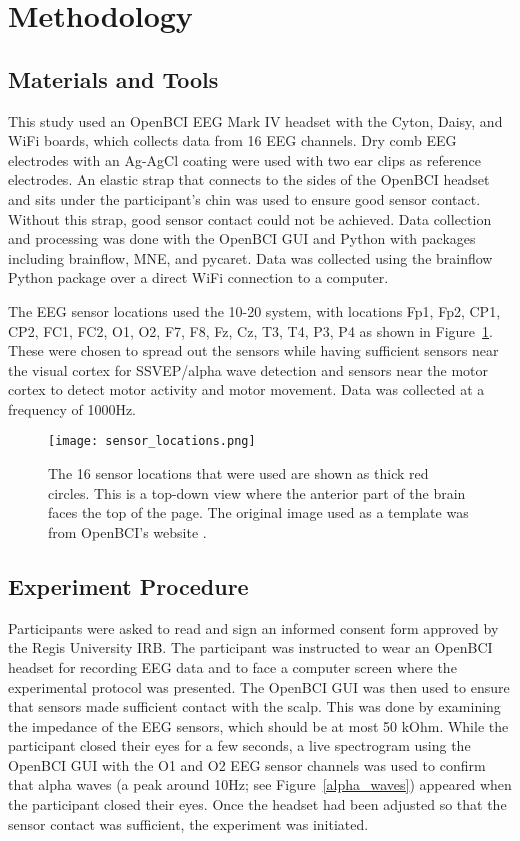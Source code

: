\documentclass{article}
\begin{document}
\section{Methodology}
\label{sec:methodology}
\subsection{Materials and Tools}
This study used an OpenBCI EEG Mark IV headset with the Cyton, Daisy, and WiFi boards, which collects data from 16 EEG channels. Dry comb EEG electrodes with an Ag-AgCl coating were used with two ear clips as reference electrodes. An elastic strap that connects to the sides of the OpenBCI headset and sits under the participant's chin was used to ensure good sensor contact. Without this strap, good sensor contact could not be achieved. Data collection and processing was done with the OpenBCI GUI and Python with packages including brainflow, MNE, and pycaret. Data was collected using the brainflow Python package over a direct WiFi connection to a computer.

The EEG sensor locations used the 10-20 system, with locations Fp1, Fp2, CP1, CP2, FC1, FC2, O1, O2, F7, F8, Fz, Cz, T3, T4, P3, P4 as shown in Figure~\ref{sensor-locations}. These were chosen to spread out the sensors while having sufficient sensors near the visual cortex for SSVEP/alpha wave detection and sensors near the motor cortex to detect motor activity and motor movement. Data was collected at a frequency of 1000Hz.

\begin{figure}
    \centering
    \texttt{[image: sensor\_locations.png]}
    \caption{The 16 sensor locations that were used are shown as thick red circles. This is a top-down view where the anterior part of the brain faces the top of the page. The original image used as a template was from OpenBCI's website \citep{noauthor_ultracortex_nodate}.}
    \label{sensor-locations}
\end{figure}

\subsection{Experiment Procedure}
Participants were asked to read and sign an informed consent form approved by the Regis University IRB. The participant was instructed to wear an OpenBCI headset for recording EEG data and to face a computer screen where the experimental protocol was presented. The OpenBCI GUI was then used to ensure that sensors made sufficient contact with the scalp. This was done by examining the impedance of the EEG sensors, which should be at most 50 kOhm. While the participant closed their eyes for a few seconds, a live spectrogram using the OpenBCI GUI with the O1 and O2 EEG sensor channels was used to confirm that alpha waves (a peak around 10Hz; see Figure~\ref{alpha_waves}) appeared when the participant closed their eyes. Once the headset had been adjusted so that the sensor contact was sufficient, the experiment was initiated.
\end{document}
